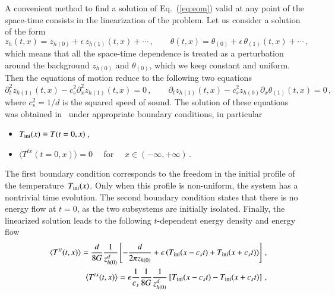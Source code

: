 \documentclass[epj]{webofc}
\newcommand{\ini}{{\rm \mbox{{\scriptsize  ini}}}}
\begin{document}
A convenient method to find a solution of Eq.~(\ref{eq:eom}) valid at any point of the space-time consists in the linearization of the problem. Let us consider a solution of the form~\cite{Megias:2015tva}
\begin{equation}
z_h(t,x) = z_{h(0)} + \epsilon \, z_{h(1)}(t,x) + \cdots  \,, \qquad \theta(t,x) = \theta_{(0)} + \epsilon \, \theta_{(1)}(t,x) + \cdots  \,, \label{eq:zhtheta}
\end{equation}
which means that all the space-time dependence is treated as a perturbation around the background $ z_{h(0)}$ and $\theta_{(0)}$, which we keep constant and uniform. Then the equations of motion reduce to the following two equations
\begin{equation}
\partial_t^2 z_{h(1)}(t,x) -  c_s^2 \partial_x^2 z_{h(1)}(t,x) = 0 \,,  \qquad \partial_t z_{h(1)}(t,x)  - c_s^2 z_{h(0)} \partial_x \theta_{(1)}(t,x) = 0   \,,
\end{equation}
where $c_s^2 = 1/d$ is the squared speed of sound. The solution of these equations was obtained in~\cite{Megias:2015tva} under appropriate boundary conditions, in particular
\begin{itemize}
\item $T_{\ini}(x) \equiv T(t=0,x)\,$,
\item $\langle T^{tx}(t=0,x)\rangle = 0 \quad$ for $ \quad x \in (-\infty, +\infty)\,$.
\end{itemize}
The first boundary condition corresponds to the freedom in the initial profile of the temperature~$T_{\ini}(x)$. Only when this profile is non-uniform, the system has a nontrivial time evolution. The second boundary condition states that there is no energy flow at $t=0$, as the two subsystems are initially isolated. Finally, the linearized solution leads to the following $t$-dependent energy density and energy flow~\cite{Megias:2015tva}
\begin{eqnarray}
&&\langle T^{tt}(t,x) \rangle = \frac{d}{8 G} \frac{1}{z_{h(0)}^{d}} \left[ -\frac{d}{2 \pi z_{h(0)}}  + \epsilon \, ( T_\ini(x - c_s t) + T_\ini(x + c_s t) )  \right]   \,,  \label{eq:Tttlinearized} \\
&&\langle T^{tx}(t,x) \rangle = \epsilon \frac{1}{c_s} \frac{1}{8 G } \frac{1}{z_{h(0)}^{d}} \left[ T_\ini(x - c_s t) - T_\ini(x + c_s t) \right]   \,,  \label{eq:Ttxlinearized}
\end{eqnarray}
\end{document}
